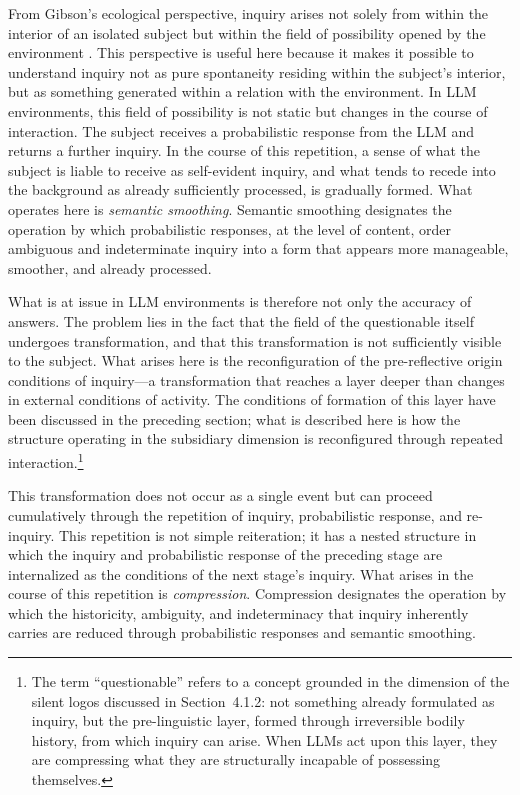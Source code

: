 \documentclass[12pt]{article}
\begin{document}
From Gibson's ecological perspective, inquiry arises not solely from within the interior of an isolated subject but within the field of possibility opened by the environment \citep{gibson1979}. This perspective is useful here because it makes it possible to understand inquiry not as pure spontaneity residing within the subject's interior, but as something generated within a relation with the environment. In LLM environments, this field of possibility is not static but changes in the course of interaction. The subject receives a probabilistic response from the LLM and returns a further inquiry. In the course of this repetition, a sense of what the subject is liable to receive as self-evident inquiry, and what tends to recede into the background as already sufficiently processed, is gradually formed. What operates here is \textit{semantic smoothing}. Semantic smoothing designates the operation by which probabilistic responses, at the level of content, order ambiguous and indeterminate inquiry into a form that appears more manageable, smoother, and already processed.

What is at issue in LLM environments is therefore not only the accuracy of answers. The problem lies in the fact that the field of the questionable itself undergoes transformation, and that this transformation is not sufficiently visible to the subject. What arises here is the reconfiguration of the pre-reflective origin conditions of inquiry---a transformation that reaches a layer deeper than changes in external conditions of activity. The conditions of formation of this layer have been discussed in the preceding section; what is described here is how the structure operating in the subsidiary dimension is reconfigured through repeated interaction.\footnote{The term ``questionable'' refers to a concept grounded in the dimension of the silent logos discussed in Section~4.1.2: not something already formulated as inquiry, but the pre-linguistic layer, formed through irreversible bodily history, from which inquiry can arise. When LLMs act upon this layer, they are compressing what they are structurally incapable of possessing themselves.}

This transformation does not occur as a single event but can proceed cumulatively through the repetition of inquiry, probabilistic response, and re-inquiry. This repetition is not simple reiteration; it has a nested structure in which the inquiry and probabilistic response of the preceding stage are internalized as the conditions of the next stage's inquiry. What arises in the course of this repetition is \textit{compression}. Compression designates the operation by which the historicity, ambiguity, and indeterminacy that inquiry inherently carries are reduced through probabilistic responses and semantic smoothing.
\end{document}
